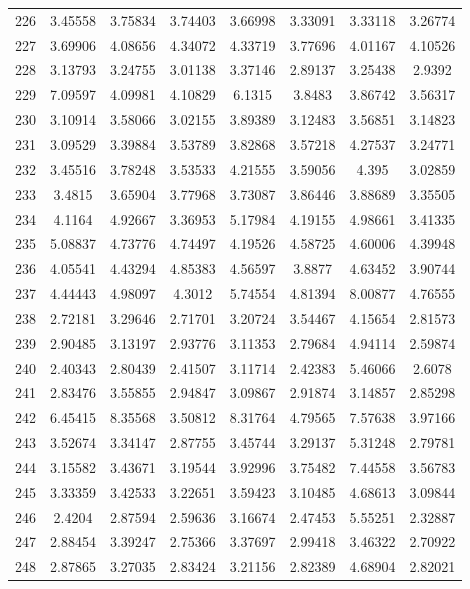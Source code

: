 \begin{center}
\begin{longtable}{cccccccc}
226 & 3.45558 & 3.75834 & 3.74403 & 3.66998 & 3.33091 & 3.33118 & 3.26774\\
227 & 3.69906 & 4.08656 & 4.34072 & 4.33719 & 3.77696 & 4.01167 & 4.10526\\
228 & 3.13793 & 3.24755 & 3.01138 & 3.37146 & 2.89137 & 3.25438 & 2.9392\\
229 & 7.09597 & 4.09981 & 4.10829 & 6.1315 & 3.8483 & 3.86742 & 3.56317\\
230 & 3.10914 & 3.58066 & 3.02155 & 3.89389 & 3.12483 & 3.56851 & 3.14823\\
231 & 3.09529 & 3.39884 & 3.53789 & 3.82868 & 3.57218 & 4.27537 & 3.24771\\
232 & 3.45516 & 3.78248 & 3.53533 & 4.21555 & 3.59056 & 4.395 & 3.02859\\
233 & 3.4815 & 3.65904 & 3.77968 & 3.73087 & 3.86446 & 3.88689 & 3.35505\\
234 & 4.1164 & 4.92667 & 3.36953 & 5.17984 & 4.19155 & 4.98661 & 3.41335\\
235 & 5.08837 & 4.73776 & 4.74497 & 4.19526 & 4.58725 & 4.60006 & 4.39948\\
236 & 4.05541 & 4.43294 & 4.85383 & 4.56597 & 3.8877 & 4.63452 & 3.90744\\
237 & 4.44443 & 4.98097 & 4.3012 & 5.74554 & 4.81394 & 8.00877 & 4.76555\\
238 & 2.72181 & 3.29646 & 2.71701 & 3.20724 & 3.54467 & 4.15654 & 2.81573\\
239 & 2.90485 & 3.13197 & 2.93776 & 3.11353 & 2.79684 & 4.94114 & 2.59874\\
240 & 2.40343 & 2.80439 & 2.41507 & 3.11714 & 2.42383 & 5.46066 & 2.6078\\
241 & 2.83476 & 3.55855 & 2.94847 & 3.09867 & 2.91874 & 3.14857 & 2.85298\\
242 & 6.45415 & 8.35568 & 3.50812 & 8.31764 & 4.79565 & 7.57638 & 3.97166\\
243 & 3.52674 & 3.34147 & 2.87755 & 3.45744 & 3.29137 & 5.31248 & 2.79781\\
244 & 3.15582 & 3.43671 & 3.19544 & 3.92996 & 3.75482 & 7.44558 & 3.56783\\
245 & 3.33359 & 3.42533 & 3.22651 & 3.59423 & 3.10485 & 4.68613 & 3.09844\\
246 & 2.4204 & 2.87594 & 2.59636 & 3.16674 & 2.47453 & 5.55251 & 2.32887\\
247 & 2.88454 & 3.39247 & 2.75366 & 3.37697 & 2.99418 & 3.46322 & 2.70922\\
248 & 2.87865 & 3.27035 & 2.83424 & 3.21156 & 2.82389 & 4.68904 & 2.82021\\

\end{longtable}
\end{center}
